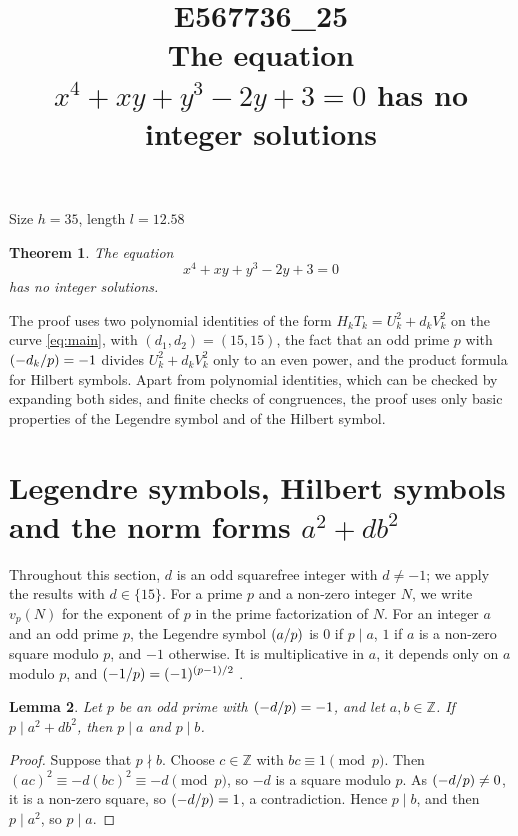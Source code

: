 \documentclass[11pt]{article}
\title{\textbf{E567736\_25}\\[4pt] {\Large The equation $x^{4}+xy+y^{3}-2y+3=0$ has no integer solutions}}
\author{}
\date{}
\newtheorem{theorem}{Theorem}
\newtheorem{lemma}[theorem]{Lemma}
\newcommand{\Z}{\mathbb{Z}}
\newcommand{\leg}[2]{\mathchoice{\biggl(\dfrac{#1}{#2}\biggr)}{(#1/#2)}{(#1/#2)}{(#1/#2)}}
\begin{document}
\maketitle
\vspace{-8ex}
\begin{center}
Size $h=35$, length $l=12.58$
\end{center}

\begin{theorem}\label{thm:main}
The equation
\begin{equation}\label{eq:main}
x^{4}+xy+y^{3}-2y+3=0
\end{equation}
has no integer solutions.
\end{theorem}

The proof uses two polynomial identities of the form $H_kT_k=U_k^2+d_kV_k^2$ on the curve \eqref{eq:main}, with $(d_{1},d_{2})=(15,15)$, the fact that an odd prime $p$ with $\leg{-d_k}{p}=-1$ divides $U_k^2+d_kV_k^2$ only to an even power, and the product formula for Hilbert symbols. Apart from polynomial identities, which can be checked by expanding both sides, and finite checks of congruences, the proof uses only basic properties of the Legendre symbol and of the Hilbert symbol.

\section{Legendre symbols, Hilbert symbols and the norm forms $a^2+db^2$}

Throughout this section, $d$ is an odd squarefree integer with $d\neq-1$; we apply the results with $d\in\{15\}$. For a prime $p$ and a non-zero integer $N$, we write $v_p(N)$ for the exponent of $p$ in the prime factorization of $N$. For an integer $a$ and an odd prime $p$, the Legendre symbol $\leg{a}{p}$ is $0$ if $p\mid a$, $1$ if $a$ is a non-zero square modulo $p$, and $-1$ otherwise. It is multiplicative in $a$, it depends only on $a$ modulo $p$, and $\leg{-1}{p}=(-1)^{(p-1)/2}$ \cite[Chapter~5]{IR}.

\begin{lemma}\label{lem:divides}
Let $p$ be an odd prime with $\leg{-d}{p}=-1$, and let $a,b\in\Z$. If $p\mid a^2+db^2$, then $p\mid a$ and $p\mid b$.
\end{lemma}

\begin{proof}
Suppose that $p\nmid b$. Choose $c\in\Z$ with $bc\equiv1\pmod p$. Then $(ac)^2\equiv-d(bc)^2\equiv-d\pmod p$, so $-d$ is a square modulo $p$. As $\leg{-d}{p}\neq0$, it is a non-zero square, so $\leg{-d}{p}=1$, a contradiction. Hence $p\mid b$, and then $p\mid a^2$, so $p\mid a$.
\end{proof}
\end{document}

